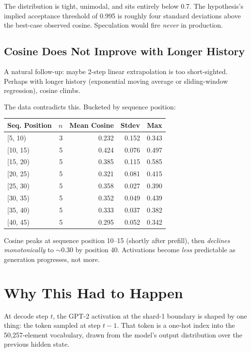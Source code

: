 \documentclass[11pt,letterpaper]{article}
\begin{document}
The distribution is tight, unimodal, and sits entirely below 0.7. The hypothesis's implied acceptance threshold of 0.995 is roughly four standard deviations above the best-case observed cosine. Speculation would fire \emph{never} in production.

\subsection{Cosine Does Not Improve with Longer History}

A natural follow-up: maybe 2-step linear extrapolation is too short-sighted. Perhaps with longer history (exponential moving average or sliding-window regression), cosine climbs.

The data contradicts this. Bucketed by sequence position:

\begin{table}[h]
\centering
\begin{tabular}{lrrrr}
\toprule
Seq. Position & $n$ & Mean Cosine & Stdev & Max \\
\midrule
[5, 10) & 3 & 0.232 & 0.152 & 0.343 \\
[10, 15) & 5 & 0.424 & 0.076 & 0.497 \\
[15, 20) & 5 & 0.385 & 0.115 & 0.585 \\
[20, 25) & 5 & 0.321 & 0.081 & 0.415 \\
[25, 30) & 5 & 0.358 & 0.027 & 0.390 \\
[30, 35) & 5 & 0.352 & 0.049 & 0.439 \\
[35, 40) & 5 & 0.333 & 0.037 & 0.382 \\
[40, 45) & 5 & 0.295 & 0.052 & 0.342 \\
\bottomrule
\end{tabular}
\end{table}

Cosine peaks at sequence position 10–15 (shortly after prefill), then \emph{declines monotonically} to $\sim 0.30$ by position 40. Activations become \emph{less} predictable as generation progresses, not more.

\section{Why This Had to Happen}

At decode step $t$, the GPT-2 activation at the shard-1 boundary is shaped by one thing: the token sampled at step $t-1$. That token is a one-hot index into the 50,257-element vocabulary, drawn from the model's output distribution over the previous hidden state.
\end{document}
